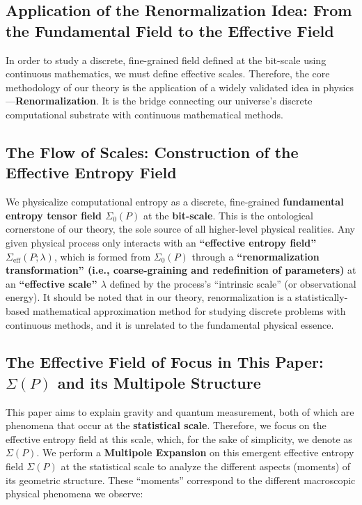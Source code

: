 \documentclass[11pt]{article}
\begin{document}
\subsection{Application of the Renormalization Idea: From the Fundamental Field to the Effective Field}
In order to study a discrete, fine-grained field defined at the bit-scale using continuous mathematics, we must define effective scales. Therefore, the core methodology of our theory is the application of a widely validated idea in physics—\textbf{Renormalization}. It is the bridge connecting our universe's discrete computational substrate with continuous mathematical methods.

\subsection{The Flow of Scales: Construction of the Effective Entropy Field}
We physicalize computational entropy as a discrete, fine-grained \textbf{fundamental entropy tensor field $\Sigma_0(P)$} at the \textbf{bit-scale}. This is the ontological cornerstone of our theory, the sole source of all higher-level physical realities. Any given physical process only interacts with an \textbf{``effective entropy field'' $\Sigma_{\text{eff}}(P; \lambda)$}, which is formed from $\Sigma_0(P)$ through a \textbf{``renormalization transformation'' (i.e., coarse-graining and redefinition of parameters)} at an \textbf{``effective scale'' $\lambda$} defined by the process's ``intrinsic scale'' (or observational energy). It should be noted that in our theory, renormalization is a statistically-based mathematical approximation method for studying discrete problems with continuous methods, and it is unrelated to the fundamental physical essence.

\subsection{The Effective Field of Focus in This Paper: $\Sigma(P)$ and its Multipole Structure}
This paper aims to explain gravity and quantum measurement, both of which are phenomena that occur at the \textbf{statistical scale}. Therefore, we focus on the effective entropy field at this scale, which, for the sake of simplicity, we denote as $\Sigma(P)$. We perform a \textbf{Multipole Expansion} on this emergent effective entropy field $\Sigma(P)$ at the statistical scale to analyze the different aspects (moments) of its geometric structure. These ``moments'' correspond to the different macroscopic physical phenomena we observe:
\end{document}
